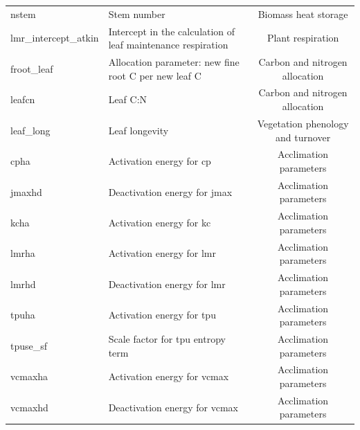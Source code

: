 \documentclass[draft]{agujournal2019}
\begin{document}
\begin{landscape}
\begin{table}[h]
\begin{tabular}{l l c}
nstem & Stem number & Biomass heat storage \\
lmr\_intercept\_atkin & Intercept in the calculation of leaf maintenance respiration& Plant respiration \\
froot\_leaf & Allocation parameter: new fine root C per new leaf C & Carbon and nitrogen allocation \\
leafcn & Leaf C:N & Carbon and nitrogen allocation \\
leaf\_long & Leaf longevity & Vegetation phenology and turnover \\
cpha & Activation energy for cp & Acclimation parameters \\
jmaxhd & Deactivation energy for jmax & Acclimation parameters \\
kcha & Activation energy for kc & Acclimation parameters \\
lmrha & Activation energy for lmr & Acclimation parameters \\
lmrhd & Deactivation energy for lmr & Acclimation parameters \\
tpuha & Activation energy for tpu & Acclimation parameters \\
tpuse\_sf & Scale factor for tpu entropy term & Acclimation parameters \\
vcmaxha & Activation energy for vcmax & Acclimation parameters \\
vcmaxhd & Deactivation energy for vcmax & Acclimation parameters \\
 \hline
 \end{tabular}
 \end{table}
\end{landscape}
\end{document}
